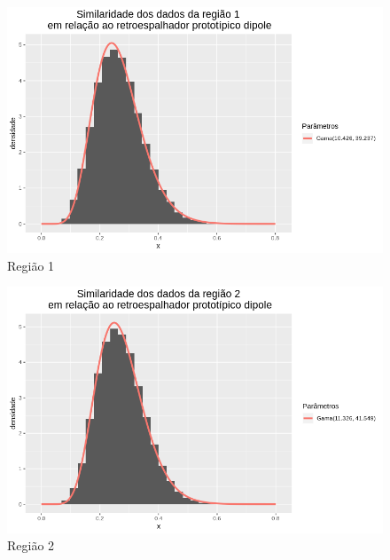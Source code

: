 \documentclass[12pt]{article}
\begin{document}
\begin{figure}[!h]
    \centering
    \includegraphics[width = \linewidth]{../../Images/Report_18_12_20/dip_region1.png}
    \caption{Região 1}
    \label{fig:dip_r1}
\end{figure}

\begin{figure}[!h]
    \centering
    \includegraphics[width = \linewidth]{../../Images/Report_18_12_20/dip_region2.png}
    \caption{Região 2}
    \label{fig:dip_r2}
\end{figure}
\end{document}

